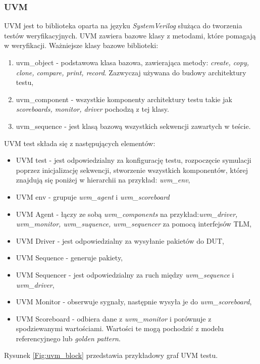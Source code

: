 \documentclass[11pt,a4paper]{article}
\begin{document}
		\subsubsection{UVM}
		\hspace{5mm}
			UVM jest to biblioteka oparta na języku \textit{SystemVerilog} służąca do tworzenia testów weryfikacyjnych. UVM zawiera bazowe klasy z metodami, które pomagają w weryfikacji. Ważniejsze klasy bazowe biblioteki:
			\begin{enumerate}
				\item uvm\_object - podstawowa klasa bazowa, zawierająca metody: \textit{create, copy, clone, compare, print, record}. Zazwyczaj używana do budowy architektury testu,
				\item uvm\_component - wszystkie komponenty architektury testu takie jak \textit{scoreboards, monitor, driver} pochodzą z tej klasy.
				\item uvm\_sequence - jest klasą bazową wszystkich sekwencji zawartych w teście.
			\end{enumerate}
UVM test składa się z następujących elementów:
\begin{itemize}
	\item UVM test - jest odpowiedzialny za konfigurację testu, rozpoczęcie symulacji poprzez inicjalizację sekwencji, stworzenie wszystkich komponentów, której znajdują się poniżej w hierarchii na przykład: \textit{uvm\_env},
	\item UVM env - grupuje \textit{uvm\_agent} i \textit{uvm\_scoreboard}
	\item UVM Agent - łączy ze sobą \textit{uvm\_components} na przykład:\textit{uvm\_driver, uvm\_monitor, uvm\_suquence, uvm\_sequencer} za pomocą interfejsów TLM,
	\item UVM Driver - jest odpowiedzialny za wysyłanie pakietów do DUT,
	\item UVM Sequence - generuje pakiety,
	\item UVM Sequencer - jest odpowiedzialny za ruch między \textit{uvm\_sequence} i \textit{uvm\_driver},
	\item UVM Monitor - obserwuje sygnały, następnie wysyła je do \textit{uvm\_scoreboard},
	\item UVM Scoreboard - odbiera dane z \textit{uvm\_monitor} i porównuje z spodziewanymi wartościami. Wartości te mogą pochodzić z modelu referencyjnego lub \textit{golden pattern}.
\end{itemize}
		Rysunek \ref{Fig:uvm_block} przedstawia przykładowy graf UVM testu.\\
\end{document}
